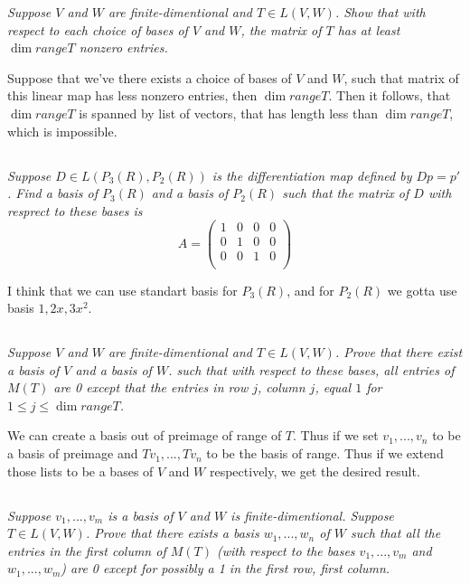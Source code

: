 \documentclass[11pt,oneside,titlepage]{book}
\begin{document}
\textit{Suppose $V$ and $W$ are finite-dimentional and $T \in L(V, W)$. Show that with respect
  to each choice of bases of $V$ and $W$, the matrix of $T$ has at least $\dim range T$ nonzero
  entries.}

Suppose that we've there exists a choice of bases of $V$ and $W$, such that matrix of this
linear map has less nonzero entries, then $\dim range T$. Then it follows, that
$\dim range T$ is spanned by list of vectors, that has length less than $\dim range T$,
which is impossible.


\subsection{}

\textit{Suppose $D \in L(P_3(R), P_2(R))$ is the differentiation map defined by $Dp = p'$. Find
  a basis of $P_3(R)$ and a basis of $P_2(R)$ such that the matrix of $D$ with resprect to these
  bases is }
$$
A =
\begin{pmatrix}
  1 & 0 & 0 & 0 \\
  0 & 1 & 0 & 0 \\
  0 & 0 & 1 & 0 \\
\end{pmatrix}
$$

I think that we can use standart basis for $P_3(R)$, and for $P_2(R)$ we gotta use
basis $1, 2x, 3x^2$.

\subsection{}

\textit{Suppose $V$ and $W$ are finite-dimentional and $T \in L(V, W)$. Prove that there exist
  a basis of $V$ and a basis of $W$. such that with respect to these bases, all entries of $M(T)$
  are 0 except that the entries in row $j$, column $j$, equal $1$ for
  $1 \leq j \leq \dim range T$.}

We can create a basis out of preimage of range of $T$. Thus if we set $v_1, ..., v_n$ to be a
basis of preimage and $T v_1, ..., T v_n$ to be the basis of range. Thus if we extend those
lists to be a bases of $V$ and $W$ respectively, we get the desired result.

\subsection{}

\textit{Suppose $v_1, ..., v_m$ is a basis of $V$ and $W$ is finite-dimentional. Suppose
  $T \in L(V, W)$. Prove that there exists a basis $w_1, ..., w_n$ of $W$ such that
  all the entries in the first column of $M(T)$ (with respect to the bases $v_1, ..., v_m$ and
  $w_1, ..., w_m$) are 0 except for possibly a 1 in the first row, first column.}
\end{document}
